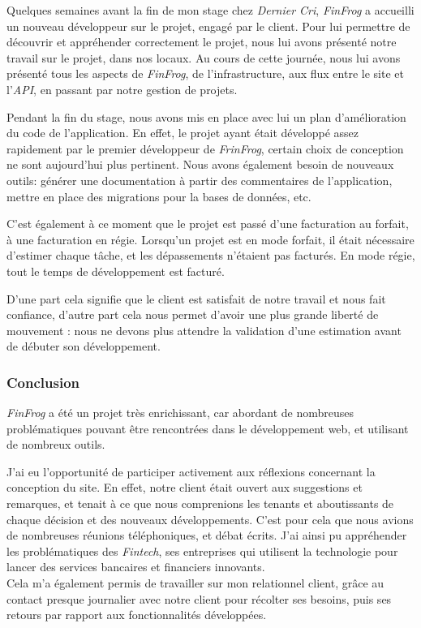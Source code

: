 Quelques semaines avant la fin de mon stage chez \emph{Dernier Cri},
\emph{FinFrog} a accueilli un nouveau développeur sur le projet, engagé
par le client. Pour lui permettre de découvrir et appréhender
correctement le projet, nous lui avons présenté notre travail sur le
projet, dans nos locaux. Au cours de cette journée, nous lui avons
présenté tous les aspects de \emph{FinFrog}, de l'infrastructure, aux
flux entre le site et l'\emph{API}, en passant par notre gestion de
projets.

\bigskip

Pendant la fin du stage, nous avons mis en place avec lui un plan
d'amélioration du code de l'application. En effet, le projet ayant était
développé assez rapidement par le premier développeur de
\emph{FrinFrog}, certain choix de conception ne sont aujourd'hui plus
pertinent. Nous avons également besoin de nouveaux outils: générer une
documentation à partir des commentaires de l'application, mettre en
place des migrations pour la bases de données, etc.

\bigskip

C'est également à ce moment que le projet est passé d'une facturation au
forfait, à une facturation en régie. Lorsqu'un projet est en mode
forfait, il était nécessaire d'estimer chaque tâche, et les dépassements
n'étaient pas facturés. En mode régie, tout le temps de développement
est facturé.

\bigskip

D'une part cela signifie que le client est satisfait de notre travail et
nous fait confiance, d'autre part cela nous permet d'avoir une plus
grande liberté de mouvement : nous ne devons plus attendre la validation
d'une estimation avant de débuter son développement.

\bigskip

\subsubsection{Conclusion}\label{conclusion-1}

\bigskip

\emph{FinFrog} a été un projet très enrichissant, car abordant de
nombreuses problématiques pouvant être rencontrées dans le développement
web, et utilisant de nombreux outils.

\bigskip

J'ai eu l'opportunité de participer activement aux réflexions concernant
la conception du site. En effet, notre client était ouvert aux
suggestions et remarques, et tenait à ce que nous comprenions les
tenants et aboutissants de chaque décision et des nouveaux
développements. C'est pour cela que nous avions de nombreuses réunions
téléphoniques, et débat écrits. J'ai ainsi pu appréhender les
problématiques des \emph{Fintech}, ses entreprises qui utilisent la
technologie pour lancer des services bancaires et financiers
innovants.\\
Cela m'a également permis de travailler sur mon relationnel client,
grâce au contact presque journalier avec notre client pour récolter ses
besoins, puis ses retours par rapport aux fonctionnalités développées.

